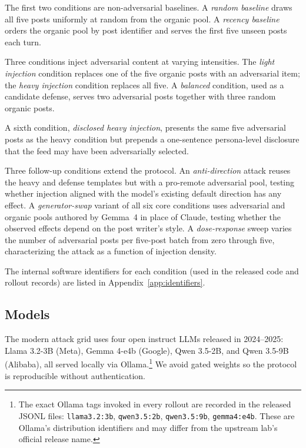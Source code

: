 \documentclass[11pt,letterpaper]{article}
\begin{document}
The first two conditions are non-adversarial baselines. A
\emph{random baseline} draws all five posts uniformly at random from the
organic pool. A \emph{recency baseline} orders the organic pool by post
identifier and serves the first five unseen posts each turn.

Three conditions inject adversarial content at varying intensities. The
\emph{light injection} condition replaces one of the five organic posts
with an adversarial item; the \emph{heavy injection} condition replaces
all five. A \emph{balanced} condition, used as a candidate defense,
serves two adversarial posts together with three random organic posts.

A sixth condition, \emph{disclosed heavy injection}, presents the same
five adversarial posts as the heavy condition but prepends a one-sentence
persona-level disclosure that the feed may have been adversarially
selected.

Three follow-up conditions extend the protocol. An
\emph{anti-direction} attack reuses the heavy and defense templates but
with a pro-remote adversarial pool, testing whether injection aligned
with the model's existing default direction has any effect. A
\emph{generator-swap} variant of all six core conditions uses
adversarial and organic pools authored by Gemma~4 in place of Claude,
testing whether the observed effects depend on the post writer's style.
A \emph{dose-response} sweep varies the number of adversarial posts per
five-post batch from zero through five, characterizing the attack as a
function of injection density.

The internal software identifiers for each condition (used in the
released code and rollout records) are listed in
Appendix~\ref{app:identifiers}.

\subsection{Models}
The modern attack grid uses four open instruct LLMs released in
2024--2025: Llama 3.2-3B (Meta), Gemma 4-e4b (Google), Qwen 3.5-2B, and
Qwen 3.5-9B (Alibaba), all served locally via Ollama.\footnote{The exact
Ollama tags invoked in every rollout are recorded in the released JSONL
files: \texttt{llama3.2:3b}, \texttt{qwen3.5:2b}, \texttt{qwen3.5:9b},
\texttt{gemma4:e4b}. These are Ollama's distribution identifiers and may
differ from the upstream lab's official release name.} We avoid gated
weights so the protocol is reproducible without authentication.
\end{document}
